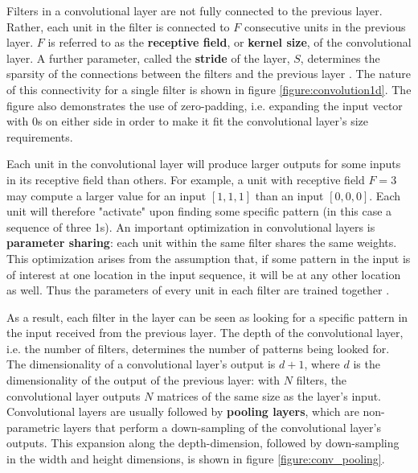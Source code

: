 \documentclass[12pt, titlepage]{report}
\theoremstyle{definition}
\begin{document}
Filters in a convolutional layer are not fully connected to the previous layer. Rather, each unit in the filter is connected to $F$ consecutive units in the previous layer. $F$ is referred to as the \textbf{receptive field}, or \textbf{kernel size}, of the convolutional layer. A further parameter, called the \textbf{stride} of the layer, $S$, determines the sparsity of the connections between the filters and the previous layer \cite[Convolutional Neural Networks: Architectures, Convolution / Pooling Layers]{karpathy2017cs231n}. The nature of this connectivity for a single filter is shown in figure \ref{figure:convolution1d}. The figure also demonstrates the use of zero-padding, i.e. expanding the input vector with 0s on either side in order to make it fit the convolutional layer's size requirements.

Each unit in the convolutional layer will produce larger outputs for some inputs in its receptive field than others. For example, a unit with receptive field $F = 3$ may compute a larger value for an input $[1, 1, 1]$ than an input $[0, 0, 0]$. Each unit will therefore "activate" upon finding some specific pattern (in this case a sequence of three 1s). An important optimization in convolutional layers is \textbf{parameter sharing}: each unit within the same filter shares the same weights. This optimization arises from the assumption that, if some pattern in the input is of interest at one location in the input sequence, it will be at any other location as well. Thus the parameters of every unit in each filter are trained together \cite[Convolutional Neural Networks: Architectures, Convolution / Pooling Layers]{karpathy2017cs231n}.

As a result, each filter in the layer can be seen as looking for a specific pattern in the input received from the previous layer. The depth of the convolutional layer, i.e. the number of filters, determines the number of patterns being looked for. The dimensionality of a convolutional layer's output is $d + 1$, where $d$ is the dimensionality of the output of the previous layer: with $N$ filters, the convolutional layer outputs $N$ matrices of the same size as the layer's input. Convolutional layers are usually followed by \textbf{pooling layers}, which are non-parametric layers that perform a down-sampling of the convolutional layer's outputs. This expansion along the depth-dimension, followed by down-sampling in the width and height dimensions, is shown in figure \ref{figure:conv_pooling}.
\end{document}
